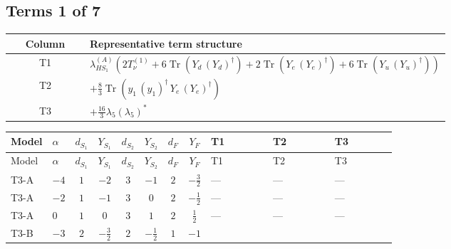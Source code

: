 \documentclass[8pt]{article}
\begin{document}
\begin{landscape}
\subsection*{Terms 1 of 7}
\begin{center}
\begin{tabular}{@{}c >{\raggedright\arraybackslash}p{0.82\linewidth}@{}}
\toprule
Column & Representative term structure \\
\midrule
T1 & \(\displaystyle {\lambda_{HS_1}^{(A)}} (2 T_{\nu}^{(1)}+6 \operatorname{Tr}\!\left({Y_d}\,\left({Y_d}\right)^{\dagger}\right)+2 \operatorname{Tr}\!\left({Y_e}\,\left({Y_e}\right)^{\dagger}\right)+6 \operatorname{Tr}\!\left({Y_u}\,\left({Y_u}\right)^{\dagger}\right))\) \\
\midrule
T2 & \(\displaystyle +\frac{8}{3} \operatorname{Tr}\!\left({y_1}\,\left({y_1}\right)^{\dagger}\,{Y_e}\,\left({Y_e}\right)^{\dagger}\right)\) \\
\midrule
T3 & \(\displaystyle +\frac{16}{3} {\lambda_5} \left({\lambda_5}\right)^{*}\) \\
\midrule
\bottomrule
\end{tabular}
\end{center}
\smallskip
\tiny
\begin{longtable}{@{}llcccccc >{\raggedright\arraybackslash}p{0.21\linewidth} >{\raggedright\arraybackslash}p{0.21\linewidth} >{\raggedright\arraybackslash}p{0.21\linewidth}@{}}
\toprule
Model & $\alpha$ & $d_{S_1}$ & $Y_{S_1}$ & $d_{S_2}$ & $Y_{S_2}$ & $d_F$ & $Y_F$ & T1 & T2 & T3 \\
\midrule
\endfirsthead
\toprule
Model & $\alpha$ & $d_{S_1}$ & $Y_{S_1}$ & $d_{S_2}$ & $Y_{S_2}$ & $d_F$ & $Y_F$ & T1 & T2 & T3 \\
\midrule
\endhead
T3-A & $-4$ & $1$ & $-2$ & $3$ & $-1$ & $2$ & $-\frac{3}{2}$ & --- & --- & --- \\
\midrule
T3-A & $-2$ & $1$ & $-1$ & $3$ & $0$ & $2$ & $-\frac{1}{2}$ & --- & --- & --- \\
\midrule
T3-A & $0$ & $1$ & $0$ & $3$ & $1$ & $2$ & $\frac{1}{2}$ & --- & --- & --- \\
\midrule
T3-B & $-3$ & $2$ & $-\frac{3}{2}$ & $2$ & $-\frac{1}{2}$ & $1$ & $-1$ & \scriptsize\adjustbox{max width=\linewidth}{$\begin{gathered} {\lambda_{HS_1}^{(A)}} (2 T_{\nu}^{(1)}+6 \operatorname{Tr}\!\left({Y_d}\,\left({Y_d}\right)^{\dagger}\right)+2 \operatorname{Tr}\!\left({Y_e}\,\left({Y_e}\right)^{\dagger}\right)+6 \operatorname{Tr}\!\left({Y_u}\,\left({Y_u}\right)^{\dagger}\right))\end{gathered}$} & \scriptsize\adjustbox{max width=\linewidth}{$\begin{gathered} +\frac{8}{3} \operatorname{Tr}\!\left({y_1}\,\left({y_1}\right)^{\dagger}\,{Y_e}\,\left({Y_e}\right)^{\dagger}\right)\end{gathered}$} & \scriptsize\adjustbox{max width=\linewidth}{$\begin{gathered} +\frac{16}{3} {\lambda_5} \left({\lambda_5}\right)^{*}\end{gathered}$} \\

\end{longtable}
\end{landscape}
\end{document}
